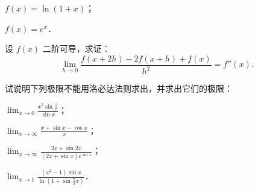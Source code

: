 \begin{xiti}
\begin{ziti}
\item $f(x) = \ln(1+x)$；
\item $f(x) = e^x$．
\end{ziti}
\item 设 $f(x)$ 二阶可导，求证：
\[
\lim_{h\to0} \frac{f(x+2h) - 2f(x+h) + f(x)}{h^2} = f''(x).
\]
\item 试说明下列极限不能用洛必达法则求出，并求出它们的极限：
\begin{ziti}
\item $\lim_{x\to0} \frac{x^2 \sin\frac{1}{x}}{\sin x}$；
\item $\lim_{x\to\infty} \frac{x + \sin x - \cos x}{x}$；
\item $\lim_{x\to\infty} \frac{2x + \sin 2x}{(2x + \sin x)e^{\sin x}}$；
\item $\lim_{x\to1} \frac{(x^2 - 1)\sin x}{\ln(1 + \sin \frac{\pi}{2}x)}$．
\end{ziti}
\end{xiti}
